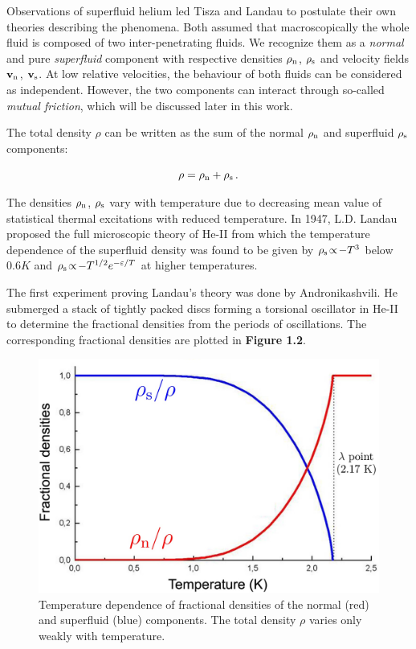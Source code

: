 Observations of superfluid helium led Tisza\cite{tisza} and Landau\cite{landau} to postulate their own theories describing the phenomena. Both assumed that macroscopically the whole fluid is composed of two inter-penetrating fluids. We recognize them as a \textit{normal} and pure \textit{superfluid} component with respective densities $ \rho_{\mathrm{n}} $, $\rho_{\mathrm{s}} $ and velocity fields  $\mathbf{v}_{\mathrm{n}} $, $ \mathbf{v}_{\mathrm{s}} $. At low relative velocities, the behaviour of both fluids can be considered as independent. However, the two components can interact through so-called \textit{mutual friction}, which will be discussed later in this work.

The total density $\rho$ can be written as the sum of the normal $\rho_{\mathrm{n}}$ and superfluid $\rho_{\mathrm{s}}$ components:

$$\rho = \rho_{\mathrm{n}} + \rho_{\mathrm{s}}\,.$$

The densities $ \rho_{\mathrm{n}} $, $\rho_{\mathrm{s}} $ vary with temperature due to decreasing mean value of statistical thermal excitations with reduced temperature. In 1947, L.D. Landau proposed\cite{landau_superfluid} the full microscopic theory of He-II from which the temperature dependence of the superfluid density was found to be given by $\rho_{\mathrm{s}}\!\propto\! -T^3$ below $0.6\unit{K}$ and $\rho_{\mathrm{s}}\!\propto\! -T^{1/2} e^{-\varepsilon/T}$ at higher temperatures.

The first experiment proving Landau's theory was done by Andronikashvili\cite{andro}. He submerged a stack of tightly packed discs forming a torsional oscillator in He-II  to determine the fractional densities from the periods of oscillations. The corresponding fractional densities are plotted in {\sffamily\textbf{Figure 1.2}}.

\begin{figure}[h]
\centering

\includegraphics[scale=0.3]{graphics/densities}

\caption{Temperature dependence of fractional densities of the normal (red) and superfluid (blue) components. The total density $\rho$ varies only weakly with temperature.}
\end{figure}







